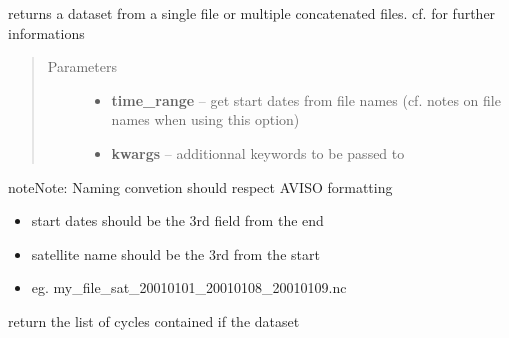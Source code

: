 \documentclass[letterpaper,10pt,english]{sphinxmanual}
\begin{document}
\begin{fulllineitems}
\begin{fulllineitems}
\label{altimetry.data:altimetry.data.alti_data.__init__}
returns a dataset from a single file or multiple concatenated files. cf. {\hyperref[altimetry.data:altimetry.data.hydro_data]{}} for further informations
\begin{quote}\begin{description}
\item[{Parameters}] \leavevmode\begin{itemize}
\item {} 
\textbf{time\_range} -- get start dates from file names (cf. notes on file names when using this option)

\item {} 
\textbf{kwargs} -- additionnal keywords to be passed to {\hyperref[altimetry.data:altimetry.data.hydro_data.__init__]{}}

\end{itemize}

\end{description}\end{quote}

\begin{notice}{note}{Note:}
Naming convetion should respect AVISO formatting
\begin{itemize}
\item {} 
start dates should be the 3rd field from the end

\item {} 
satellite name should be the 3rd from the start

\item {} 
eg. my\_file\_sat\_20010101\_20010108\_20010109.nc

\end{itemize}
\end{notice}

\end{fulllineitems}


\begin{fulllineitems}
\label{altimetry.data:altimetry.data.alti_data.cycle_list}
return the list of cycles contained if the dataset


\end{fulllineitems}
\end{fulllineitems}
\end{document}
